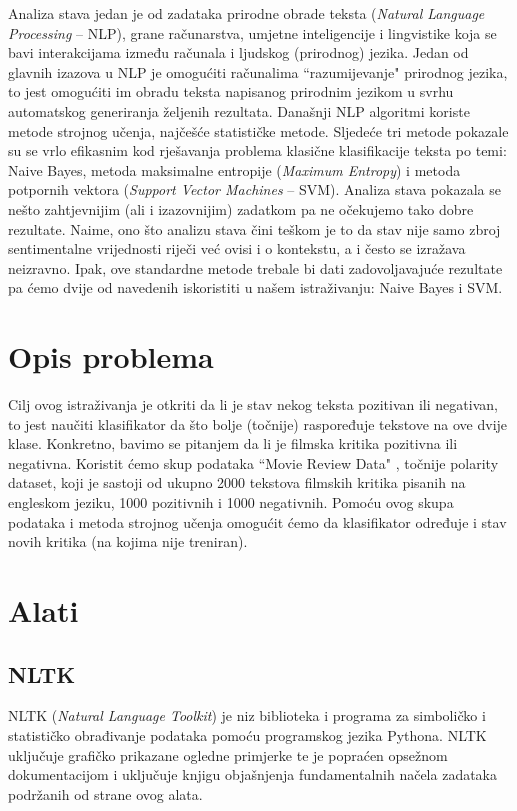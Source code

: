 \documentclass[conference]{IEEEtran}
\begin{document}
Analiza stava jedan je od zadataka prirodne obrade teksta (\textit{Natural Language Processing} -- NLP), grane računarstva, umjetne inteligencije i lingvistike koja se bavi interakcijama između računala i ljudskog (prirodnog) jezika. Jedan od glavnih izazova u NLP je omogućiti računalima ``razumijevanje" prirodnog jezika, to jest omogućiti im obradu teksta napisanog prirodnim jezikom u svrhu automatskog generiranja željenih rezultata. Današnji NLP algoritmi koriste metode strojnog učenja, najčešće statističke metode. Sljedeće tri metode pokazale su se vrlo efikasnim kod rješavanja problema klasične klasifikacije teksta po temi: Naive Bayes, metoda maksimalne entropije (\textit{Maximum Entropy}) i metoda potpornih vektora (\textit{Support Vector Machines} -- SVM). Analiza stava pokazala se nešto zahtjevnijim (ali i izazovnijim) zadatkom pa ne očekujemo tako dobre rezultate. Naime, ono što analizu stava čini teškom je to da stav nije samo zbroj sentimentalne vrijednosti riječi već ovisi i o kontekstu, a i često se izražava neizravno. Ipak, ove standardne metode trebale bi dati zadovoljavajuće rezultate pa ćemo dvije od navedenih iskoristiti u našem istraživanju: Naive Bayes i SVM.

\section{Opis problema}

Cilj ovog istraživanja je otkriti da li je stav nekog teksta pozitivan ili negativan, to jest naučiti klasifikator da što bolje (točnije) raspoređuje tekstove na ove dvije klase. Konkretno, bavimo se pitanjem da li je filmska kritika pozitivna ili negativna. Koristit ćemo skup podataka ``Movie Review Data" \cite{dataset}, točnije polarity dataset, koji je sastoji od ukupno 2000 tekstova filmskih kritika pisanih na engleskom jeziku, 1000 pozitivnih i 1000 negativnih. Pomoću ovog skupa podataka i metoda strojnog učenja omogućit ćemo da klasifikator određuje i stav novih kritika (na kojima nije treniran).

\section{Alati}

\subsection{NLTK}

NLTK (\textit{Natural Language Toolkit}) je niz biblioteka i programa za simboličko i statističko obrađivanje podataka pomoću programskog jezika Pythona. NLTK uključuje grafičko prikazane ogledne primjerke te je popraćen opsežnom dokumentacijom i uključuje knjigu \cite{nltk} objašnjenja fundamentalnih načela zadataka podržanih od strane ovog alata.
\end{document}
